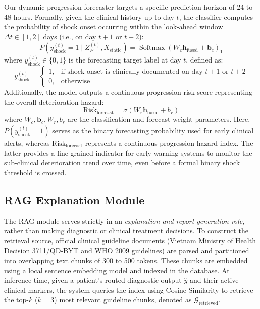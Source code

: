 \documentclass[conference]{IEEEtran}
\begin{document}
Our dynamic progression forecaster targets a specific prediction horizon of 24 to 48 hours. Formally, given the clinical history up to day $t$, the classifier computes the probability of shock onset occurring within the look-ahead window $\Delta t \in [1, 2]$ days (i.e., on day $t+1$ or $t+2$):
\begin{equation}
    P(y_{\text{shock}}^{(t)} = 1 \mid Z_P^{(t)}, X_{\text{static}}) = \operatorname{Softmax}(W_c \mathbf{h}_{\text{fused}} + \mathbf{b}_c)_1
\end{equation}
where $y_{\text{shock}}^{(t)} \in \{0, 1\}$ is the forecasting target label at day $t$, defined as:
\begin{equation}
    y_{\text{shock}}^{(t)} = \begin{cases}
    1, & \text{if shock onset is clinically documented on day } t+1 \text{ or } t+2 \\
    0, & \text{otherwise}
    \end{cases}
\end{equation}
Additionally, the model outputs a continuous progression risk score representing the overall deterioration hazard:
\begin{equation}
    \text{Risk}_{\text{forecast}} = \sigma(W_r \mathbf{h}_{\text{fused}} + b_r)
\end{equation}
where $W_c, \mathbf{b}_c, W_r, b_r$ are the classification and forecast weight parameters. Here, $P(y_{\text{shock}}^{(t)} = 1)$ serves as the binary forecasting probability used for early clinical alerts, whereas $\text{Risk}_{\text{forecast}}$ represents a continuous progression hazard index. The latter provides a fine-grained indicator for early warning systems to monitor the sub-clinical deterioration trend over time, even before a formal binary shock threshold is crossed.


\subsection{RAG Explanation Module}
The RAG module serves strictly in an \textit{explanation and report generation role}, rather than making diagnostic or clinical treatment decisions. To construct the retrieval source, official clinical guideline documents (Vietnam Ministry of Health Decision 3711/QD-BYT and WHO 2009 guidelines) are parsed and partitioned into overlapping text chunks of 300 to 500 tokens. These chunks are embedded using a local sentence embedding model and indexed in the database. At inference time, given a patient's routed diagnostic output $\hat{y}$ and their active clinical markers, the system queries the index using Cosine Similarity to retrieve the top-$k$ ($k=3$) most relevant guideline chunks, denoted as $\mathcal{G}_{\text{retrieved}}$.
\end{document}
